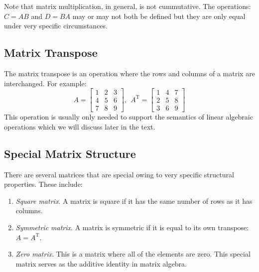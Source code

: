 Note that matrix multiplication, in general, is not cummutative.  The operations: $C = AB$ and $D=BA$ may or may not both be defined but they are only equal under very specific circumstances.

\subsection{Matrix Transpose}
The matrix transpose is an operation where the rows and columns of a matrix are interchanged.  For example:
\begin{equation*}A = 
\left[
\begin{matrix}
1 & 2 & 3 \\
4 & 5 & 6 \\
7 & 8 & 9
\end{matrix}
\right], \ \ 
A^{\text{T}} = 
\left[
\begin{matrix}
1 & 4 & 7 \\
2 & 5 & 8 \\
3 & 6 & 9
\end{matrix}
\right]
\end{equation*}
This operation is usually only needed to support the semantics of linear algebraic operations which we will discuss later in the text.

\subsection{Special Matrix Structure}
There are several matrices that are special owing to very specific structural properties.  These include:
\begin{enumerate}
\item \emph{Square matrix}.  A matrix is square if it has the same number of rows as it has columns.

\item \emph{Symmetric matrix}. A matrix is symmetric if it is equal to its own transpose: $A = A^{\text{T}}$.

\item \emph{Zero matrix}. This is a matrix where all of the elements are zero.  This special matrix serves as the additive identity in matrix algebra.

\end{enumerate}

